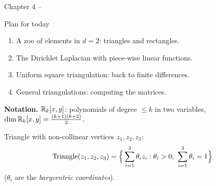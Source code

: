 
{Chapter 4}
{}
{--}

\begin{frame}{Plan for today}
    \begin{enumerate}
        \item A zoo of elements in $d = 2$: triangles and rectangles.
        \item The Dirichlet Laplacian with piece-wise linear functions.
        \item Uniform square triangulation: back to finite differences.
        \item General triangulations: computing the matrices.
    \end{enumerate}
    \bigskip
    \textbf{Notation.} ${\mathbb R}_k[x,y]$: polynomials of degree $\le k$ in two variables, \ $\dim {\mathbb R}_k[x,y] = \frac{(k+1)(k+2)}{2}$.
    \medskip

    Triangle with non-collinear vertices $z_1, z_2, z_3$:
    \[
        \operatorname{Triangle}(z_1,z_2,z_3) = \Big\{ \sum_{i=1}^3 \theta_i z_i : \theta_i > 0,\ \sum_{i=1}^3 \theta_i = 1 \Big\}
    \]
    ($\theta_i$ are the \emph{barycentric coordinates}).
\end{frame}


